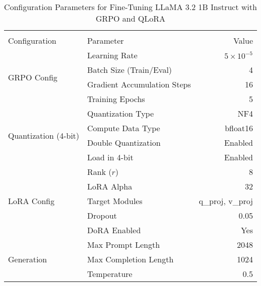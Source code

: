 
\begin{table}[H]
  \centering
  \begin{tabular}{llr}
    \toprule \\
    Configuration & Parameter & Value \\
    \midrule
    \multirow{4}{*}{GRPO Config} 
      & Learning Rate & \(5 \times 10^{-5}\) \\
      & Batch Size (Train/Eval) & 4 \\
      & Gradient Accumulation Steps & 16 \\
      & Training Epochs & 5 \\
    \midrule
    \multirow{4}{*}{Quantization (4-bit)} 
      & Quantization Type & NF4 \\
      & Compute Data Type & bfloat16 \\
      & Double Quantization & Enabled \\
      & Load in 4-bit & Enabled \\
    \midrule
    \multirow{5}{*}{LoRA Config} 
      & Rank (\(r\)) & 8 \\
      & LoRA Alpha & 32 \\
      & Target Modules & q\_proj, v\_proj \\
      & Dropout & 0.05 \\
      & DoRA Enabled & Yes \\
    \midrule
    \multirow{3}{*}{Generation} 
      & Max Prompt Length & 2048 \\
      & Max Completion Length & 1024 \\
      & Temperature & 0.5 \\
    \bottomrule
  \end{tabular}
  \vspace{0.2cm}
  \caption{Configuration Parameters for Fine-Tuning LLaMA 3.2 1B Instruct with GRPO and QLoRA}
  \label{tab:training_config}
\end{table}